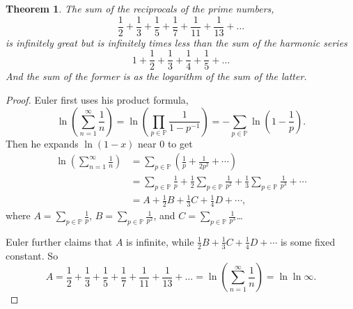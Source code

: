 \documentclass[a4paper]{article}
\newtheorem{theorem}{Theorem}[section]
\theoremstyle{definition}
\theoremstyle{remark}
\begin{document}
\begin{theorem}
  The sum of the reciprocals of the prime numbers,
  \[
  \frac{1}{2}+\frac{1}{3}+\frac{1}{5}+\frac{1}{7}+\frac{1}{11}+\frac{1}{13}+\dots
  \]
  is infinitely great but is infinitely times less than the sum of the harmonic series
  \[
  1+\frac{1}{2}+\frac{1}{3}+\frac{1}{4}+\frac{1}{5}+\dots
  \]
  And the sum of the former is as the logarithm of the sum of the latter.
  \cite{bib:Euler}
  \label{thm:EulerReciprocalOfPrimes}
\end{theorem}
\begin{proof}
  Euler first uses his product formula,
  \[
  \ln\left( \sum_{n=1}^\infty\frac{1}{n} \right)=\ln\left( \prod_{p\in\mathbb{P}}\frac{1}{1-p^{-1}} \right)=-\sum_{p\in\mathbb{P}}\ln\left( 1-\frac{1}{p} \right)
  .
  \]
  Then he expands $\ln(1-x)$ near $0$ to get
  \begin{align*}
    \ln\left( \sum_{n=1}^\infty\frac{1}{n} \right)&=\sum_{p\in\mathbb{P}}\left( \frac{1}{p}+\frac{1}{2p^2}+\cdots \right)\\
    &=\sum_{p\in\mathbb{P}}\frac{1}{p}+\frac{1}{2}\sum_{p\in\mathbb{P}}\frac{1}{p^2}+\frac{1}{3}\sum_{p\in\mathbb{P}}\frac{1}{p^3}+\cdots\\
    &=A+\frac{1}{2}B+\frac{1}{3}C+\frac{1}{4}D+\cdots
    ,
  \end{align*}
  where $\displaystyle A=\sum_{p\in\mathbb{P}}\frac{1}{p}$, $\displaystyle B=\sum_{p\in\mathbb{P}}\frac{1}{p^2}$, and $\displaystyle C=\sum_{p\in\mathbb{P}}\frac{1}{p^3}$\dots

  Euler further claims that $A$ is infinite, while $\frac{1}{2}B+\frac{1}{3}C+\frac{1}{4}D+\cdots$ is some fixed constant. So 
  \[
  A=\frac{1}{2}+\frac{1}{3}+\frac{1}{5}+\frac{1}{7}+\frac{1}{11}+\frac{1}{13}+\dots=\ln \left( \sum_{n=1}^\infty\frac{1}{n} \right) = \ln\ln\infty
  .
  \]
\end{proof}
\end{document}
